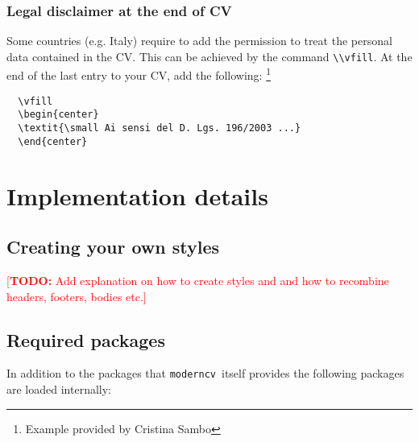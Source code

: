 \documentclass[a4paper,11pt]{article}
\newcommand{\todox}[1]{\textcolor{red}{[\textbf{TODO:} #1]}}
\newcommand{\code}[1]{\lstinline!#1!}
\newcommand{\Code}[1]{\lstinline!#1!~} %
\newcommand{\Moderncv}{\Code{moderncv}}
\begin{document}
\subsubsection{Legal disclaimer at the end of CV}
Some countries (e.g. Italy) require to add the permission to treat the personal data contained in the CV. This can be achieved by the command \code{\\vfill}. At the end of the last entry to your 
CV, add the following:%
\footnote{Example provided by Cristina Sambo} %
\begin{lstlisting}
  \vfill
  \begin{center} 
  \textit{\small Ai sensi del D. Lgs. 196/2003 ...}
  \end{center}
\end{lstlisting}

\section{Implementation details}
\label{section:implementationDetails}

\subsection{Creating your own styles}
\todox{Add explanation on how to create styles and and how to recombine headers, footers, bodies etc.}

\subsection{Required packages}
\label{section:implementationDetails:requiredPackages}
In addition to the packages that \Moderncv itself provides the following packages are loaded internally:
\end{document}
